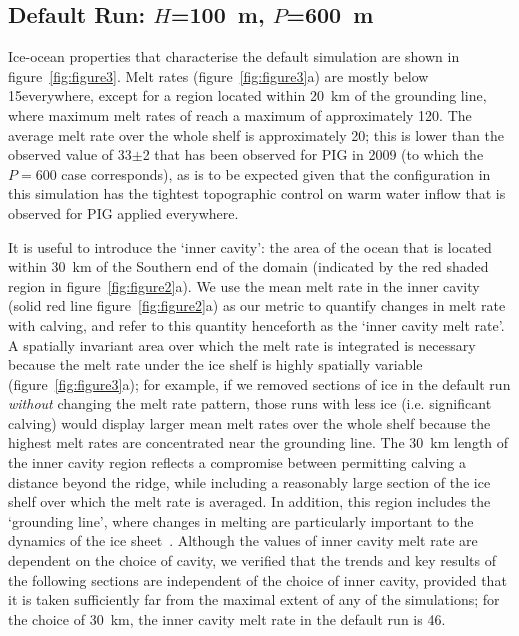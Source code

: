 \documentclass[draft]{agujournal2019}
\begin{document}
\subsection{Default Run: $H$=100~m, $P$=600~m}\label{S:Baseline:Default}
Ice-ocean properties that characterise the default simulation are shown in figure~\ref{fig:figure3}. Melt rates (figure~\ref{fig:figure3}a) are mostly below  15\mpryr everywhere, except for a region located within 20~km of the grounding line, where maximum melt rates of reach a maximum of approximately 120\mpryr. The average melt rate over the whole shelf is approximately 20\mpryr; this is lower than the observed value of 33$\pm$2 that has been observed for PIG in 2009 (to which the $P=600$ case corresponds), as is to be expected given that the configuration in this simulation has the tightest topographic control on warm water inflow that is observed for PIG applied everywhere.

It is useful to introduce the `inner cavity': the area of the ocean that is located within 30~km of the Southern end of the domain (indicated by the red shaded region in figure~\ref{fig:figure2}a). We use the mean melt rate in the inner cavity (solid red line figure~\ref{fig:figure2}a) as our metric to quantify changes in melt rate with calving, and refer to this quantity henceforth as the `inner cavity melt rate'. A spatially invariant area over which the melt rate is integrated is necessary because the melt rate under the ice shelf is highly spatially variable (figure~\ref{fig:figure3}a); for example, if we removed sections of ice in the default run \textit{without} changing the melt rate pattern, those runs with less ice (i.e. significant calving) would display larger mean melt rates over the whole shelf because the highest melt rates are concentrated near the grounding line. The 30~km length of the inner cavity region reflects a compromise between permitting calving a distance beyond the ridge, while including a reasonably large section of the ice shelf over which the melt rate is averaged. In addition, this region includes the `grounding line', where changes in melting are particularly important to the dynamics of the ice sheet~\cite{Seroussi2014Cryo, Athern2017GRL}. Although the values of inner cavity melt rate are dependent on the choice of cavity, we verified that the trends and key results of the following sections are independent of the choice of inner cavity, provided that it is taken sufficiently far from the maximal extent of any of the simulations; for the choice of 30~km, the inner cavity melt rate in the default run is 46\mpryr.
\end{document}
